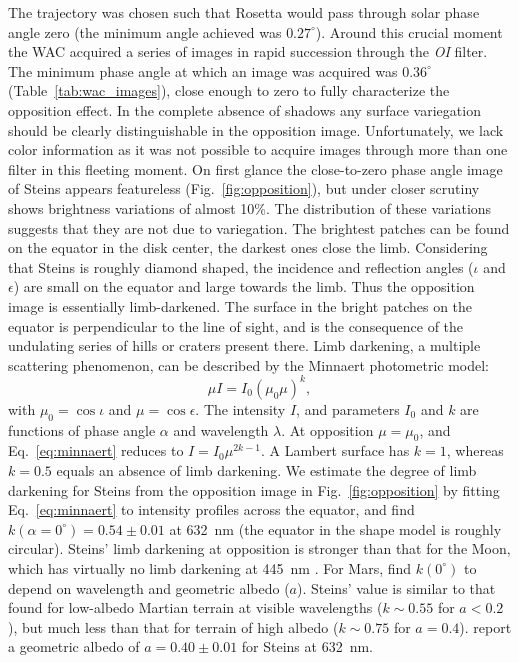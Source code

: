 \documentclass[preprint,3p,authoryear]{elsarticle}
\begin{document}
The trajectory was chosen such that Rosetta would pass through solar phase angle zero (the minimum angle achieved was $0.27^\circ$). Around this crucial moment the WAC acquired a series of images in rapid succession through the {\it OI} filter. The minimum phase angle at which an image was acquired was $0.36^\circ$ (Table~\ref{tab:wac_images}), close enough to zero to fully characterize the opposition effect. In the complete absence of shadows any surface variegation should be clearly distinguishable in the opposition image. Unfortunately, we lack color information as it was not possible to acquire images through more than one filter in this fleeting moment. On first glance the close-to-zero phase angle image of Steins appears featureless (Fig.~\ref{fig:opposition}), but under closer scrutiny shows brightness variations of almost 10\%. The distribution of these variations suggests that they are not due to variegation. The brightest patches can be found on the equator in the disk center, the darkest ones close the limb. Considering that Steins is roughly diamond shaped, the incidence and reflection angles ($\iota$ and $\epsilon$) are small on the equator and large towards the limb. Thus the opposition image is essentially limb-darkened. The surface in the bright patches on the equator is perpendicular to the line of sight, and is the consequence of the undulating series of hills or craters present there. Limb darkening, a multiple scattering phenomenon, can be described by the Minnaert photometric model:
\begin{equation}
\mu I = I_0 (\mu_0 \mu)^{k},
\label{eq:minnaert}
\end{equation}
with $\mu_0 = \cos \iota$ and $\mu = \cos \epsilon$. The intensity $I$, and parameters $I_0$ and $k$ are functions of phase angle $\alpha$ and wavelength $\lambda$. At opposition $\mu = \mu_0$, and Eq.~\ref{eq:minnaert} reduces to $I = I_0 \mu^{2k-1}$. A Lambert surface has $k = 1$, whereas $k = 0.5$ equals an absence of limb darkening. We estimate the degree of limb darkening for Steins from the opposition image in Fig.~\ref{fig:opposition} by fitting Eq.~\ref{eq:minnaert} to intensity profiles across the equator, and find $k(\alpha = 0^\circ) = 0.54\pm0.01$ at 632~nm (the equator in the \citealt{K09} shape model is roughly circular). Steins' limb darkening at opposition is stronger than that for the Moon, which has virtually no limb darkening at 445~nm \citep{HV87}. For Mars, \citet{GP95} find $k(0^\circ)$ to depend on wavelength and geometric albedo ($a$). Steins' value is similar to that found for low-albedo Martian terrain at visible wavelengths ($k \sim 0.55$ for $a<0.2$), but much less than that for terrain of high albedo ($k \sim 0.75$ for $a=0.4$). \citet{K09} report a geometric albedo of $a = 0.40\pm0.01$ for Steins at 632~nm.
\end{document}

